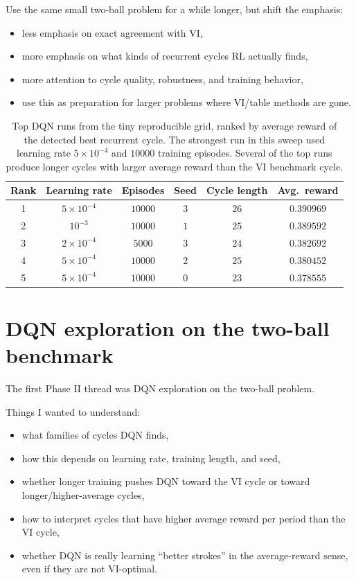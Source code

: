 \documentclass{article}
\begin{document}
Use the same small two-ball problem for a while longer, but shift the emphasis:
\begin{itemize}
    \item less emphasis on exact agreement with VI,
    \item more emphasis on what kinds of recurrent cycles RL actually finds,
    \item more attention to cycle quality, robustness, and training behavior,
    \item use this as preparation for larger problems where VI/table methods are gone.
\end{itemize}

\begin{table}[t]
\centering
\begin{tabular}{cccccc}
\hline
Rank & Learning rate & Episodes & Seed & Cycle length & Avg.\ reward \\
\hline
1 & $5\times 10^{-4}$ & $10000$ & $3$ & $26$ & $0.390969$ \\
2 & $10^{-3}$         & $10000$ & $1$ & $25$ & $0.389592$ \\
3 & $2\times 10^{-4}$ & $5000$  & $3$ & $24$ & $0.382692$ \\
4 & $5\times 10^{-4}$ & $10000$ & $2$ & $25$ & $0.380452$ \\
5 & $5\times 10^{-4}$ & $10000$ & $0$ & $23$ & $0.378555$ \\
\hline
\end{tabular}
\caption{Top DQN runs from the tiny reproducible grid, ranked by average reward of the detected best recurrent cycle. The strongest run in this sweep used learning rate $5\times 10^{-4}$ and $10000$ training episodes. Several of the top runs produce longer cycles with larger average reward than the VI benchmark cycle.}
\label{tab:dqn_tiny_grid_top_runs}
\end{table}

\section{DQN exploration on the two-ball benchmark}

The first Phase II thread was DQN exploration on the two-ball problem.

Things I wanted to understand:
\begin{itemize}
    \item what families of cycles DQN finds,
    \item how this depends on learning rate, training length, and seed,
    \item whether longer training pushes DQN toward the VI cycle or toward longer/higher-average cycles,
    \item how to interpret cycles that have higher average reward per period than the VI cycle,
    \item whether DQN is really learning ``better strokes'' in the average-reward sense, even if they are not VI-optimal.
\end{itemize}
\end{document}
